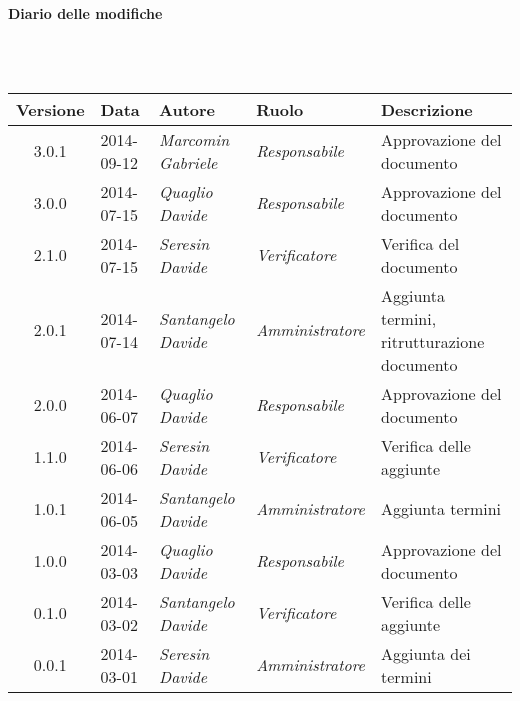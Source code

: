 \noindent\begin{Large}\textbf{Diario delle modifiche}\end{Large}\\
\\
\begin{small}
\begin{tabular}{|c|p{1.8cm}|p{2.8cm}|p{2.8cm}|p{3.5cm}|}
\hline
Versione & Data & Autore & Ruolo & Descrizione \\
\hline
\hline
3.0.1 & 2014-09-12 & 
\textit{Marcomin Gabriele} &
\textit{Responsabile} &  Approvazione del documento\\
\hline
\hline
3.0.0 & 2014-07-15 & 
\textit{Quaglio Davide} &
\textit{Responsabile} &  Approvazione del documento\\
\hline
\hline
2.1.0 & 2014-07-15 & 
\textit{Seresin Davide} &
\textit{Verificatore} &  Verifica del documento\\
\hline
\hline
2.0.1 & 2014-07-14 & 
\textit{Santangelo Davide} &
\textit{Amministratore} &  Aggiunta termini, ritrutturazione documento\\
\hline
\hline
2.0.0 & 2014-06-07 & 
\textit{Quaglio Davide} &
\textit{Responsabile} &  Approvazione del documento\\
\hline
\hline
1.1.0 & 2014-06-06 & 
\textit{Seresin Davide} &
\textit{Verificatore} &  Verifica delle aggiunte\\
\hline
\hline
1.0.1 & 2014-06-05 & 
\textit{Santangelo Davide} &
\textit{Amministratore} &  Aggiunta termini\\
\hline
\hline
1.0.0 & 2014-03-03 & 
\textit{Quaglio Davide} &
\textit{Responsabile} &  Approvazione del documento\\
\hline
0.1.0 & 2014-03-02 & 
\textit{Santangelo Davide} &
\textit{Verificatore} &  Verifica delle aggiunte\\
\hline
0.0.1 & 2014-03-01 & 
\textit{Seresin Davide} &
\textit{Amministratore} &  Aggiunta dei termini\\
\hline
\end{tabular}\\
\end{small}